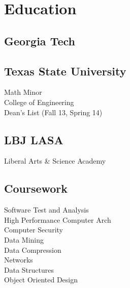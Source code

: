 \documentclass[letterpaper]{resume} %
\begin{document}
\begin{minipage}[t]{0.33\textwidth} %


\section{Education} 

\subsection{Georgia Tech}

\sectionspace

\subsection{Texas State University}
Math Minor \\
College of Engineering \\
Dean's List (Fall 13, Spring 14) \\

\sectionspace %


\subsection{LBJ LASA}
Liberal Arts \& Science Academy \\

\sectionspace %


\subsection{Coursework}

Software Test and Analysis \\
High Performance Computer Arch \\
Computer Security \\
Data Mining \\
Data Compression \\
Networks \\
Data Structures \\
Object Oriented Design


\end{minipage}
\end{document}
